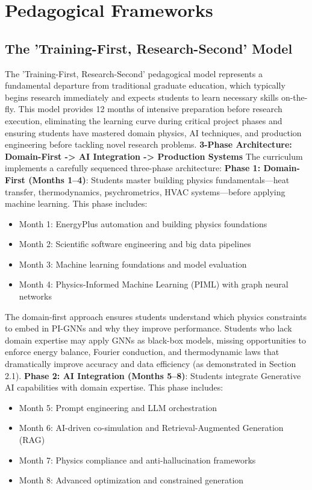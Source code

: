 \documentclass[12pt,a4paper]{article}
\begin{document}
\section{Pedagogical Frameworks}
\subsection{The 'Training-First, Research-Second' Model}
The 'Training-First, Research-Second' pedagogical model represents a fundamental departure from traditional graduate education, which typically begins research immediately and expects students to learn necessary skills on-the-fly. This model provides 12 months of intensive preparation before research execution, eliminating the learning curve during critical project phases and ensuring students have mastered domain physics, AI techniques, and production engineering before tackling novel research problems.
\textbf{3-Phase Architecture: Domain-First -> AI Integration -> Production Systems}
The curriculum implements a carefully sequenced three-phase architecture:
\textbf{Phase 1: Domain-First (Months 1--4)}: Students master building physics fundamentals---heat transfer, thermodynamics, psychrometrics, HVAC systems---before applying machine learning. This phase includes:
\begin{itemize}
  \item Month 1: EnergyPlus automation and building physics foundations
  \item Month 2: Scientific software engineering and big data pipelines
  \item Month 3: Machine learning foundations and model evaluation
  \item Month 4: Physics-Informed Machine Learning (PIML) with graph neural networks
\end{itemize}
The domain-first approach ensures students understand which physics constraints to embed in PI-GNNs and why they improve performance. Students who lack domain expertise may apply GNNs as black-box models, missing opportunities to enforce energy balance, Fourier conduction, and thermodynamic laws that dramatically improve accuracy and data efficiency (as demonstrated in Section 2.1).
\textbf{Phase 2: AI Integration (Months 5--8)}: Students integrate Generative AI capabilities with domain expertise. This phase includes:
\begin{itemize}
  \item Month 5: Prompt engineering and LLM orchestration
  \item Month 6: AI-driven co-simulation and Retrieval-Augmented Generation (RAG)
  \item Month 7: Physics compliance and anti-hallucination frameworks
  \item Month 8: Advanced optimization and constrained generation
\end{itemize}
\end{document}
